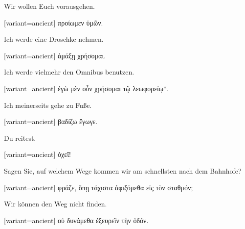 Wir wollen Euch voraus\textcompwordmark{}gehen.

\switchcolumn

\begin{greek}[variant=ancient]%
προίωμεν ὑμῶν.

\end{greek}%
\switchcolumn*

Ich werde eine Droschke nehmen.

\switchcolumn

\begin{greek}[variant=ancient]%
ἁμάξῃ χρήσομαι.

\end{greek}%
\switchcolumn*

Ich werde vielmehr den Omnibus benutzen.

\switchcolumn

\begin{greek}[variant=ancient]%
ἐγὼ μὲν οὖν χρήσομαι τῷ λεωφορείῳ{*}.

\end{greek}%
\switchcolumn*

Ich meinerseits gehe zu Fuße.

\switchcolumn

\begin{greek}[variant=ancient]%
βαδίζω ἔγωγε.

\end{greek}%
\switchcolumn*

Du reitest.

\switchcolumn

\begin{greek}[variant=ancient]%
ὀχεῖ!

\end{greek}%
\switchcolumn*

Sagen Sie, auf welchem Wege kommen wir am schnellsten nach dem Bahnhofe?

\switchcolumn

\begin{greek}[variant=ancient]%
φράζε, ὅπῃ τάχιστα ἀφιξόμεθα εἰς τὸν σταθμόν;

\end{greek}%
\switchcolumn*

Wir können den Weg nicht finden.

\switchcolumn

\begin{greek}[variant=ancient]%
οὐ δυνάμεθα ἐξευρεῖν τὴν ὁδόν.

\end{greek}%
\switchcolumn*

